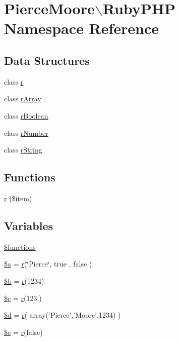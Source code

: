 \hypertarget{namespace_pierce_moore_1_1_ruby_p_h_p}{\section{Pierce\-Moore$\backslash$Ruby\-P\-H\-P Namespace Reference}
\label{namespace_pierce_moore_1_1_ruby_p_h_p}
}
\subsection*{Data Structures}
\begin{DoxyCompactItemize}
\item 
class \hyperlink{class_pierce_moore_1_1_ruby_p_h_p_1_1r}{r}
\item 
class \hyperlink{class_pierce_moore_1_1_ruby_p_h_p_1_1r_array}{r\-Array}
\item 
class \hyperlink{class_pierce_moore_1_1_ruby_p_h_p_1_1r_boolean}{r\-Boolean}
\item 
class \hyperlink{class_pierce_moore_1_1_ruby_p_h_p_1_1r_number}{r\-Number}
\item 
class \hyperlink{class_pierce_moore_1_1_ruby_p_h_p_1_1r_string}{r\-String}
\end{DoxyCompactItemize}
\subsection*{Functions}
\begin{DoxyCompactItemize}
\item 
\hyperlink{namespace_pierce_moore_1_1_ruby_p_h_p_add70f208c72bf2a57bc4ff08438cfed8}{r} (\$item)
\end{DoxyCompactItemize}
\subsection*{Variables}
\begin{DoxyCompactItemize}
\item 
\hyperlink{namespace_pierce_moore_1_1_ruby_p_h_p_aa75daea491817f3b64daa2f51128bcdf}{\$functions}
\item 
\hyperlink{namespace_pierce_moore_1_1_ruby_p_h_p_acebf83966ef6d7e5645a6b62ba368f9f}{\$a} = \hyperlink{class_pierce_moore_1_1_ruby_p_h_p_1_1r}{r}(\char`\"{}Pierce\char`\"{}, true , false )
\item 
\hyperlink{namespace_pierce_moore_1_1_ruby_p_h_p_ab9eb087b791749ae45deabb0899b7ccc}{\$b} = \hyperlink{class_pierce_moore_1_1_ruby_p_h_p_1_1r}{r}(1234)
\item 
\hyperlink{namespace_pierce_moore_1_1_ruby_p_h_p_ab73d7f4f2dae233dd561e7fdaab3a77b}{\$c} = \hyperlink{class_pierce_moore_1_1_ruby_p_h_p_1_1r}{r}(123.)
\item 
\hyperlink{namespace_pierce_moore_1_1_ruby_p_h_p_a0cf5dd496d9f5ff1edf00d234771dcfe}{\$d} = \hyperlink{class_pierce_moore_1_1_ruby_p_h_p_1_1r}{r}( array('Pierce','Moore',1234) )
\item 
\hyperlink{namespace_pierce_moore_1_1_ruby_p_h_p_ab74076a9b7e1d23d12b9e8d65e60315a}{\$e} = \hyperlink{class_pierce_moore_1_1_ruby_p_h_p_1_1r}{r}(false)
\end{DoxyCompactItemize}


